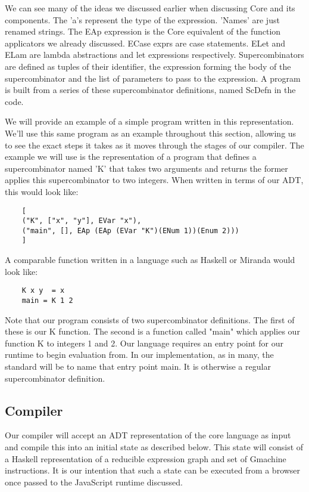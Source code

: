 \noindent We can
see many of the ideas we discussed earlier when discussing Core
and its components. The 'a's represent the type of the expression.
'Names' are just renamed strings. The EAp expression is the Core
equivalent of the function applicators we already discussed. ECase
exprs are case statements. ELet and ELam are lambda abstractions
and let expressions respectively. Supercombinators
are defined as tuples of their identifier,
the expression forming the body of the supercombinator and the 
list of parameters to pass to the expression. A program is
built from a series of these supercombinator definitions,
named ScDefn in the code. 

We will provide an example of a simple program written in this
representation. We'll use this same program as an example 
throughout this section, allowing us to see the exact steps it
takes as it moves through the stages of our compiler. The 
example we will use is the representation of a program that 
defines a supercombinator named 'K' that takes two arguments 
and returns the former applies this supercombinator to two 
integers. When written in terms of our ADT, this would look
like:

\begin{verbatim}
    [
    ("K", ["x", "y"], EVar "x"), 
    ("main", [], EAp (EAp (EVar "K")(ENum 1))(Enum 2)))
    ]
\end{verbatim}

\noindent A comparable function written in a language such
as Haskell or Miranda would look like:

\begin{verbatim}
    K x y  = x
    main = K 1 2
\end{verbatim}

\noindent Note that our
program consists of two supercombinator definitions. The first
of these is our K function. The second is a function called
"main" which applies our function K to integers 1 and 2. Our
language requires an entry point for our runtime to begin
evaluation from. In our implementation, as in many, the standard
will be to name that entry point main. It is otherwise a 
regular supercombinator definition. 

\subsection{Compiler}
Our compiler will accept an ADT representation of the core language
as input and compile this into an initial state as described below.
This state will consist of a Haskell representation of a reducible
expression graph and set of Gmachine instructions.
It is our intention that such a state can be executed from a browser
once passed to the JavaScript runtime discussed. 

